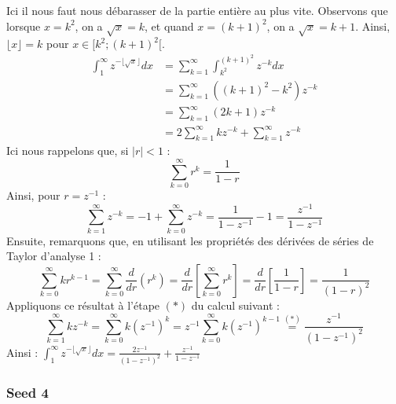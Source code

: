 \documentclass[11.5pt,french,table]{article}
\theoremstyle{exercice}
\newenvironment{packed_enum}{
\begin{enumerate}
  \setlength{\itemsep}{11pt}
  \setlength{\parskip}{0pt}
  \setlength{\parsep}{0pt}
}{\end{enumerate}}
\begin{document}
\begin{packed_enum}
    \item Ici il nous faut nous débarasser de la partie entière au plus vite. Observons que lorsque $x = k^2$, on a $\sqrt{x} = k$, et quand $x = (k+1)^2$, on a $\sqrt{x} = k+1$. Ainsi, $\lfloor x \rfloor = k$ pour $x \in [k^2; (k+1)^2[$.
    \begin{align*}
    \int_1^{\infty} z^{- \lfloor \sqrt{x} \rfloor}dx &= \sum_{k=1}^\infty \int_{k^2}^{(k+1)^2} z^{-k}dx\\ 
    &= \sum_{k=1}^\infty \left((k+1)^2 - k^2\right)z^{-k}\\ 
    &= \sum_{k=1}^\infty (2k+1)z^{-k}\\
    &= 2\sum_{k=1}^\infty kz^{-k} + \sum_{k=1}^\infty z^{-k}
    \end{align*}
    Ici nous rappelons que, si $|r| < 1$ :
    $$
    \sum_{k=0}^\infty r^k = \frac{1}{1-r}
    $$
    Ainsi, pour $r = z^{-1}$ :
    $$
    \sum_{k=1}^\infty z^{-k} = -1 + \sum_{k=0}^\infty z^{-k} = \frac{1}{1-z^{-1}} - 1 = \frac{z^{-1}}{1-z^{-1}} 
    $$
    Ensuite, remarquons que, en utilisant les propriétés des dérivées de séries de Taylor d'analyse 1 :
    $$
    \sum_{k=0}^{\infty} kr^{k-1} = \sum_{k=0}^{\infty} \frac{d}{dr}(r^k) = \frac{d}{dr}\left[\sum_{k=0}^\infty r^k\right] = \frac{d}{dr}\left[\frac{1}{1-r}\right] = \frac{1}{(1-r)^2}
    $$
    Appliquons ce résultat à l'étape $(*)$ du calcul suivant :
    $$
    \sum_{k=1}^\infty kz^{-k} = \sum_{k=0}^\infty k(z^{-1})^k = z^{-1} \sum_{k=0}^\infty k(z^{-1})^{k-1} \overset{(*)}{=} \frac{z^{-1}}{(1-z^{-1})^2}
    $$
    Ainsi :
    $
    \int_1^{\infty} z^{- \lfloor \sqrt{x} \rfloor}dx = \frac{2z^{-1}}{(1-z^{-1})^2} + \frac{z^{-1}}{1-z^{-1}} 
    $
\end{packed_enum}


\subsubsection{Seed 4}
\end{document}
